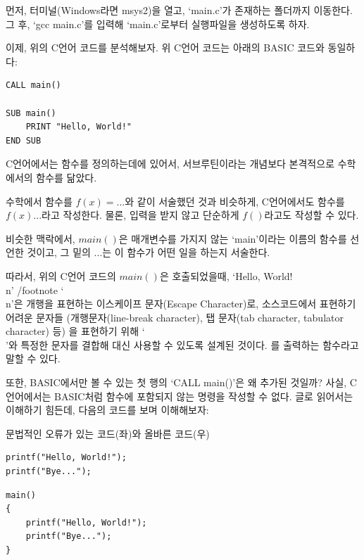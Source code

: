 \documentclass{article}
\begin{document}
먼저, 터미널(Windows라면 msys2)을 열고,
`main.c'가 존재하는 폴더까지 이동한다.
그 후, `gcc main.c'를 입력해 `main.c'로부터 실행파일을 생성하도록 하자.

이제, 위의 C언어 코드를 분석해보자.
위 C언어 코드는 아래의 BASIC 코드와 동일하다:

\begin{lstlisting}
CALL main()

SUB main()
    PRINT "Hello, World!"
END SUB
\end{lstlisting}

C언어에서는 함수를 정의하는데에 있어서,
서브루틴이라는 개념보다 본격적으로 수학에서의 함수를 닮았다.

수학에서 함수를 $f(x) = ...$와 같이 서술했던 것과 비슷하게,
C언어에서도 함수를 $f(x) { ... }$라고 작성한다.
물론, 입력을 받지 않고 단순하게 $f()$라고도 작성할 수 있다.

비슷한 맥락에서, $main()$은 매개변수를 가지지 않는 `main'이라는 이름의 함수를 선언한 것이고,
그 밑의 ${ ... }$는 이 함수가 어떤 일을 하는지 서술한다.

따라서, 위의 C언어 코드의 $main()$은 호출되었을때,
`Hello, World!\\n'
/footnote{
    `\\n'은 개행을 표현하는 이스케이프 문자(Escape Character)로,
    소스코드에서 표현하기 어려운 문자들
    (개행문자(line-break character), 탭 문자(tab character, tabulator character) 등)
    을 표현하기 위해 `\\'와 특정한 문자를 결합해 대신 사용할 수 있도록 설계된 것이다.
}
를 출력하는 함수라고 말할 수 있다.

또한, BASIC에서만 볼 수 있는 첫 행의 `CALL main()'은 왜 추가된 것일까?
사실, C언어에서는 BASIC처럼 함수에 포함되지 않는 명령을 작성할 수 없다.
글로 읽어서는 이해하기 힘든데, 다음의 코드를 보며 이해해보자:

\begin{center}

    \centering
    
    문법적인 오류가 있는 코드(좌)와 올바른 코드(우)

    \begin{minipage}{0.45\textwidth}
        \begin{lstlisting}
printf("Hello, World!");
printf("Bye...");
        \end{lstlisting}
    \end{minipage}
    \hfill
    \begin{minipage}{0.45\textwidth}
        \begin{lstlisting}
main()
{
    printf("Hello, World!");
    printf("Bye...");
}
        \end{lstlisting}
    \end{minipage}

\end{center}
\end{document}
